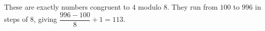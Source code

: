These are exactly numbers congruent to $4$ modulo $8$. They run from $100$ to $996$ in steps of $8$, giving $\dfrac{996-100}{8}+1=\boxed{113}$.
